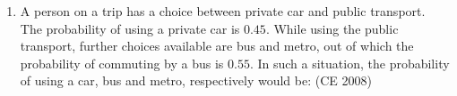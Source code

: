 \begin{enumerate}[label=\thesubsection.\arabic*,ref=\thesubsection.\theenumi]
\begin{enumerate}
\end{enumerate}
%
\item A person on a trip has a choice between private car and public transport. The probability of using a private car is $0.45$. While using the public transport, further choices available are bus and metro, out of which the probability of commuting by a bus is $0.55$. In such a situation, the probability  of using a car, bus and metro, respectively would be: \hfill (CE 2008)
\begin{enumerate}
\end{enumerate}


\end{enumerate}
